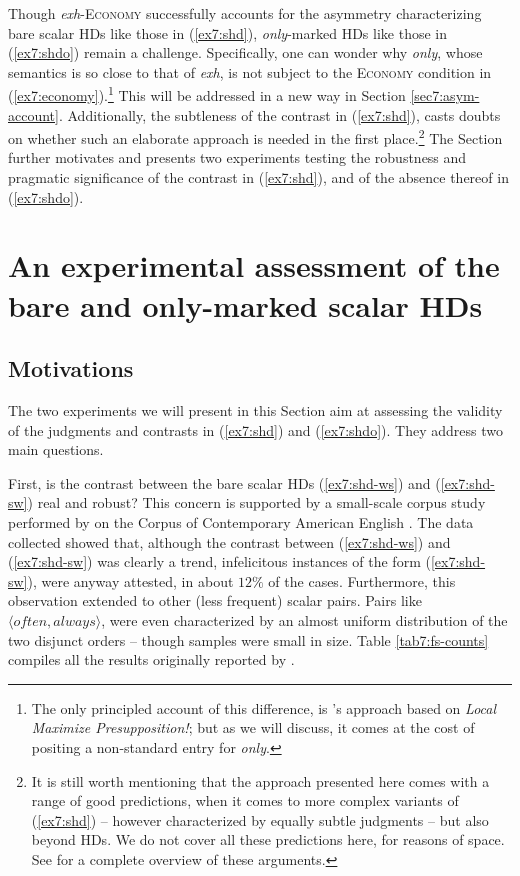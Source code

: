 Though \textit{exh}-\textsc{Economy} successfully accounts for the asymmetry characterizing bare scalar HDs like those in (\ref{ex7:shd}), \textit{only}-marked HDs like those in (\ref{ex7:shdo}) remain a challenge. Specifically, one can wonder why \textit{only}, whose semantics is so close to that of \textit{exh}, is not subject to the \textsc{Economy} condition in (\ref{ex7:economy}).\footnote{The only principled account of this difference, is \textcite{Singh2008b}'s approach based on \textit{Local Maximize Presupposition!}; but as we will discuss, it comes at the cost of positing a non-standard entry for \textit{only}.} This will be addressed in a new way in Section \ref{sec7:asym-account}. Additionally, the subtleness of the contrast in (\ref{ex7:shd}), casts doubts on whether such an elaborate approach is needed in the first place.\footnote{It is still worth mentioning that the approach presented here comes with a range of good predictions, when it comes to more complex variants of (\ref{ex7:shd}) -- however characterized by equally subtle judgments -- but also beyond HDs. We do not cover all these predictions here, for reasons of space. See \textcite{Fox2018a} for a complete overview of these arguments.} The Section further motivates and presents two experiments testing the robustness and pragmatic significance of the contrast in (\ref{ex7:shd}), and of the absence thereof in (\ref{ex7:shdo}).

\section{An experimental assessment of the bare and only-marked scalar HDs}
\subsection{Motivations}
The two experiments we will present in this Section aim at assessing the validity of the judgments and contrasts in (\ref{ex7:shd}) and (\ref{ex7:shdo}). They address two main questions.

First, is the contrast between the bare scalar HDs (\ref{ex7:shd-ws}) and (\ref{ex7:shd-sw}) real and robust? This concern is supported by a small-scale corpus study performed by \textcite{Fox2018a} on the Corpus of Contemporary American English \parencite{Davies2008}. The data collected showed that, although the contrast between (\ref{ex7:shd-ws}) and (\ref{ex7:shd-sw}) was clearly a trend, infelicitous instances of the form (\ref{ex7:shd-sw}), were anyway attested, in about $12\%$ of the cases. Furthermore, this observation extended to other (less frequent) scalar pairs. Pairs like $\langle \textit{often}, \textit{always}\rangle$, were even characterized by an almost uniform distribution of the two disjunct orders -- though samples were small in size. Table \ref{tab7:fs-counts} compiles all the results originally reported by \textcite{Fox2018a}.


